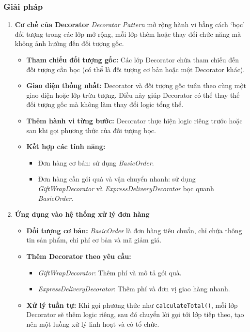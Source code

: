 \subsubsection{Giải pháp}
\begin{enumerate}
    \item \textbf{Cơ chế của Decorator}\newline
          \textit{Decorator Pattern} mở rộng hành vi bằng cách `bọc' đối tượng trong các lớp mở rộng, mỗi lớp thêm hoặc thay đổi chức năng mà không ảnh hưởng đến đối tượng gốc.
          \begin{itemize}
              \item \textbf{Tham chiếu đối tượng gốc:} Các lớp Decorator chứa tham chiếu đến đối tượng cần bọc (có thể là đối tượng cơ bản hoặc một Decorator khác).
              \item \textbf{Giao diện thống nhất:} Decorator và đối tượng gốc tuân theo cùng một giao diện hoặc lớp trừu tượng. Điều này giúp Decorator có thể thay thế đối tượng gốc mà không làm thay đổi logic tổng thể.
              \item \textbf{Thêm hành vi từng bước:} Decorator thực hiện logic riêng trước hoặc sau khi gọi phương thức của đối tượng bọc.
              \item \textbf{Kết hợp các tính năng:}
                    \begin{itemize}
                        \item Đơn hàng cơ bản: sử dụng \textit{BasicOrder}.
                        \item Đơn hàng cần gói quà và vận chuyển nhanh: sử dụng \textit{GiftWrapDecorator} và \textit{ExpressDeliveryDecorator} bọc quanh \textit{BasicOrder}.
                    \end{itemize}
          \end{itemize}

    \item \textbf{Ứng dụng vào hệ thống xử lý đơn hàng}
          \begin{itemize}
              \item \textbf{Đối tượng cơ bản:} \textit{BasicOrder} là đơn hàng tiêu chuẩn, chỉ chứa thông tin sản phẩm, chi phí cơ bản và mã giảm giá.
              \item \textbf{Thêm Decorator theo yêu cầu:}
                    \begin{itemize}
                        \item \textit{GiftWrapDecorator}: Thêm phí và mô tả gói quà.
                        \item \textit{ExpressDeliveryDecorator}: Thêm phí và đơn vị giao hàng nhanh.
                    \end{itemize}
              \item \textbf{Xử lý tuần tự:} Khi gọi phương thức như \verb|calculateTotal()|, mỗi lớp Decorator sẽ thêm logic riêng, sau đó chuyển lời gọi tới lớp tiếp theo, tạo nên một luồng xử lý linh hoạt và có tổ chức.
          \end{itemize}
\end{enumerate}

